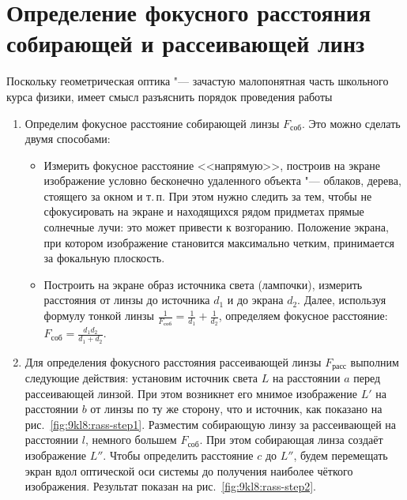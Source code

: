 \section{Определение фокусного расстояния собирающей и рассеивающей линз}
\SolveVariant
Поскольку геометрическая оптика "--- зачастую малопонятная часть школьного курса физики, имеет смысл разъяснить порядок проведения работы
\begin{enumerate}
    \item Определим фокусное расстояние собирающей линзы \(F_\text{соб}\). Это можно сделать двумя способами:
    \begin{itemize}
    	\item Измерить фокусное расстояние <<напрямую>>, построив на экране изображение условно бесконечно удаленного объекта "--- облаков, дерева, стоящего за окном и т.\,п. При этом нужно следить за тем, чтобы не сфокусировать на экране и находящихся рядом придметах прямые солнечные лучи: это может привести к возгоранию. Положение экрана, при котором изображение становится максимально четким, принимается за фокальную плоскость.
    	\item Построить на экране образ источника света (лампочки), измерить расстояния от линзы до источника \(d_1\) и до экрана \(d_2\). Далее, используя формулу тонкой линзы \(\frac{1}{F_\text{соб}} = \frac{1}{d_1} + \frac{1}{d_2}\), определяем фокусное расстояние: \(F_\text{соб}=\frac{d_1 d_2}{d_1+d_2}\).
    \end{itemize}
    \item Для определения фокусного расстояния рассеивающей линзы \(F_\text{расс}\) выполним следующие действия: установим источник света \(L\) на расстоянии \(a\) перед рассеивающей линзой. При этом возникнет его мнимое изображение \(L'\) на расстоянии \(b\) от линзы по ту же сторону, что и источник, как показано на рис.~\ref{fig:9kl8:rass-step1}. Разместим собирающую линзу за рассеивающей на расстоянии \(l\), немного большем \(F_\text{соб}\). При этом собирающая линза создаёт изображение \(L''\). Чтобы определить расстояние \(c\) до \(L''\), будем перемещать экран вдол оптической оси системы до получения наиболее чёткого изображения. Результат показан на рис.~\ref{fig:9kl8:rass-step2}.\par
    \begin{figure}[t]
    	\parbox[b]{\textwidth}{
		    \centering
}
\end{figure}
\end{enumerate}
